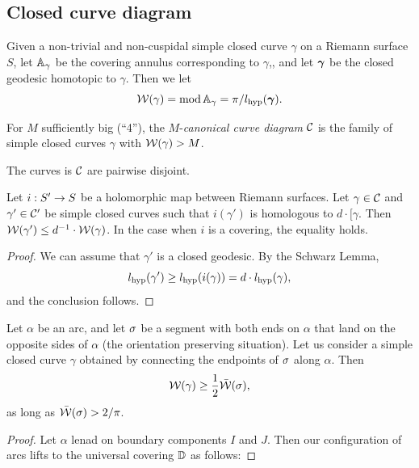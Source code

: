 {{\subsection{Closed curve diagram}

Given a non-trivial and non-cuspidal  simple closed curve $\gamma$ on a Riemann surface $S$,
let  ${\Bbb A}_\gamma$ be  the covering annulus  corresponding to $\gamma$,,
and let  ${\boldsymbol{\gamma}}$ be the closed geodesic homotopic to $\gamma$.
Then we let 
$$
    {\mathcal W}(\gamma)= \operatorname{mod} {\Bbb A}_\gamma= \pi/  l_{\mathrm{hyp}}({\boldsymbol{\gamma}}).
$$

For $M$ sufficiently big (``4''), 
the $M$-{\it canonical curve diagram} ${\mathcal C}$ is the family of simple
closed curves $\gamma$ with ${\mathcal W}(\gamma) > M$. 

\begin{lem}\label{disjointness in CC}
  The curves is ${\mathcal C}$ are pairwise disjoint.  
\end{lem} 


\begin{lem}\label{tranform rules for CC}
  Let $i: S' \rightarrow S$ be a holomorphic map between Riemann surfaces.
Let $\gamma\in {\mathcal C}$ and $\gamma'\in {\mathcal C}'$  be simple closed curves
such that $i(\gamma')$ is homologous to  $d\cdot[\gamma$. 
 Then ${\mathcal W}(\gamma') \leq d^{-1} \cdot {\mathcal W}(\gamma)$.
In the case when $i$ is a covering, the equality holds. 
\end{lem}

\begin{proof}
We can assume that $\gamma'$ is a closed geodesic.
By the Schwarz Lemma, 
$$
     l_{\mathrm{hyp}}(\gamma') \geq  l_{\mathrm{hyp}} (i(\gamma)) = d\cdot l_{\mathrm{hyp}} (\gamma),
$$
and the conclusion follows. 
\end{proof}


\begin{lem} \label{flux vs weight}
  Let $\alpha $ be an arc, and let ${\sigma}$ be a segment with both ends on
  $\alpha$ that land on the opposite sides of $\alpha$ (the
  orientation preserving situation).  Let us consider a simple closed curve $\gamma$ obtained 
  by connecting the endpoints of ${\sigma}$ along $\alpha$. Then
$$
   {\mathcal W}(\gamma) \geq \frac 12  \bar{{\mathcal W}} ({\sigma}), 
$$  
as long as $\bar {{\mathcal W}}({\sigma}) > 2/\pi$.

\end{lem}

\begin{proof}
  Let $\alpha$ lenad on boundary components $I$ and $J$.
Then our configuration of arcs lifts to the universal covering ${\Bbb D}$ as
follows:


\end{proof}}}
